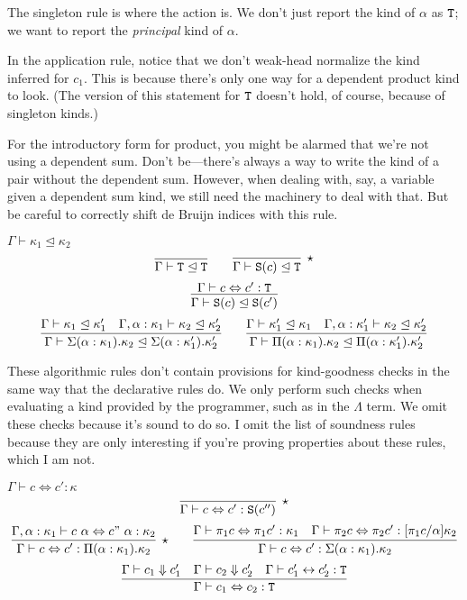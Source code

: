 The singleton rule is where the action is. We don't just report the kind of $\alpha$ as
$\textnormal{\texttt{T}}$; we want to report the \emph{principal} kind of $\alpha$.

In the application rule, notice that we don't weak-head normalize the kind inferred for
$c_1$. This is because there's only one way for a dependent product kind to look. (The version
of this statement for $\textnormal{\texttt{T}}$ doesn't hold, of course, because of singleton kinds.)

For the introductory form for product, you might be alarmed that we're not using a dependent sum.
Don't be---there's always a way to write the kind of a pair without the dependent sum. However,
when dealing with, say, a variable given a dependent sum kind, we still need the machinery to
deal with that. But be careful to correctly shift de Bruijn indices with this rule.

\begin{judgment}[Subkinding]
  $\Gamma \vdash \kappa_1 \trianglelefteq \kappa_2$
  \[
    \infer{\Gamma \vdash \T \trianglelefteq \T}{}
    \qquad
    \infer[\star]{\Gamma \vdash \S(c) \trianglelefteq \T}{}
  \]
  \[
    \infer{\Gamma \vdash \S(c) \trianglelefteq \S(c')}{\Gamma \vdash c \Leftrightarrow c' : \T}
  \]
  \[
    \infer{\Gamma \vdash \Sigma(\alpha : \kappa_1). \kappa_2 \trianglelefteq
      \Sigma(\alpha : \kappa_1').\kappa_2'}
      {\Gamma \vdash \kappa_1 \trianglelefteq \kappa_1'
      &\Gamma, \alpha : \kappa_1 \vdash \kappa_2 \trianglelefteq \kappa_2'
      }
    \qquad
    \infer{\Gamma \vdash \Pi(\alpha : \kappa_1). \kappa_2 \trianglelefteq \Pi(\alpha: \kappa_1'). \kappa_2'}
    {\Gamma \vdash \kappa_1' \trianglelefteq \kappa_1
    &\Gamma, \alpha : \kappa_1' \vdash \kappa_2 \trianglelefteq \kappa_2'
    }
  \]
\end{judgment}

These algorithmic rules don't contain provisions for kind-goodness checks in the same way
that the declarative rules do. We only perform such checks when evaluating a kind provided by
the programmer, such as in the $\Lambda$ term. We omit these checks because it's sound to do so.
I omit the list of soundness rules because they are only interesting if you're proving properties
about these rules, which I am not.


\begin{judgment} $\Gamma \vdash c \Leftrightarrow c' : \kappa$
  \[
    \infer[\star]{\Gamma \vdash c \Leftrightarrow c' : \S(c'')}{}
  \]
  \[
    \infer[\star]
      {\Gamma \vdash c \Leftrightarrow c' : \Pi(\alpha : \kappa_1). \kappa_2}
      {\Gamma, \alpha : \kappa_1 \vdash c~\alpha \Leftrightarrow c"~\alpha : \kappa_2}
    \qquad
    \infer
      {\Gamma \vdash c \Leftrightarrow c' : \Sigma(\alpha : \kappa_1). \kappa_2}
      {\Gamma \vdash \pi_1c \Leftrightarrow \pi_1 c' : \kappa_1
      &\Gamma \vdash \pi_2c \Leftrightarrow \pi_2c' : [\pi_1c/\alpha]\kappa_2
      }
  \]
  \[
    \infer{\Gamma \vdash c_1 \Leftrightarrow c_2 : \T}
      {\Gamma \vdash c_1 \Downarrow c_1'
      &\Gamma\vdash c_2 \Downarrow c_2'
      &\Gamma \vdash c_1' \leftrightarrow c_2' : \T
      }
  \]
\end{judgment}

